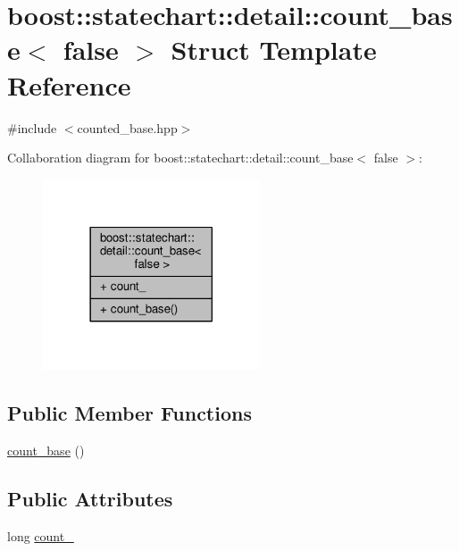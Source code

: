 \hypertarget{structboost_1_1statechart_1_1detail_1_1count__base_3_01false_01_4}{}\section{boost\+:\+:statechart\+:\+:detail\+:\+:count\+\_\+base$<$ false $>$ Struct Template Reference}
\label{structboost_1_1statechart_1_1detail_1_1count__base_3_01false_01_4}


{\ttfamily \#include $<$counted\+\_\+base.\+hpp$>$}



Collaboration diagram for boost\+:\+:statechart\+:\+:detail\+:\+:count\+\_\+base$<$ false $>$\+:
\nopagebreak
\begin{figure}[H]
\begin{center}
\leavevmode
\includegraphics[width=182pt]{structboost_1_1statechart_1_1detail_1_1count__base_3_01false_01_4__coll__graph}
\end{center}
\end{figure}
\subsection*{Public Member Functions}
\begin{DoxyCompactItemize}
\item 
\mbox{\hyperlink{structboost_1_1statechart_1_1detail_1_1count__base_3_01false_01_4_a64290a8514a633eed09867b06c2d775b}{count\+\_\+base}} ()
\end{DoxyCompactItemize}
\subsection*{Public Attributes}
\begin{DoxyCompactItemize}
\item 
long \mbox{\hyperlink{structboost_1_1statechart_1_1detail_1_1count__base_3_01false_01_4_a4adf8ac9f03da5ad5cea93a5ee6d0507}{count\+\_\+}}
\end{DoxyCompactItemize}


